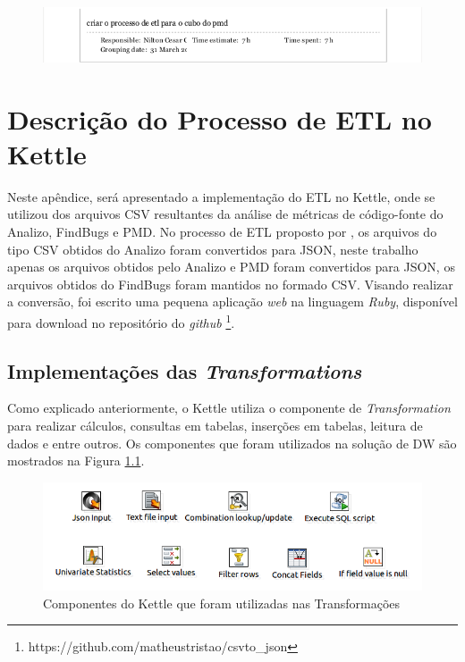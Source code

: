 \begin{apendicesenv}
\begin{figure}[h!]
\centering
\includegraphics[keepaspectratio=false,scale=0.70]{figuras/figuras_nilton/kanban5.png}
\end{figure}




\chapter{Descrição do Processo de ETL no Kettle}
\label{sec:implementação-etl}

Neste apêndice, será apresentado a implementação do ETL no Kettle, onde se utilizou dos arquivos CSV resultantes da análise de métricas de código-fonte do Analizo, FindBugs e PMD.
No processo de ETL proposto por , os arquivos do tipo CSV obtidos do Analizo foram convertidos para JSON, neste trabalho apenas os arquivos obtidos pelo Analizo e PMD foram convertidos para JSON, os arquivos obtidos do FindBugs foram mantidos no formado CSV. Visando realizar a conversão, foi escrito uma pequena aplicação \textit{web} na linguagem \textit{Ruby}, disponível para download no repositório do \textit{github} \footnote{https://github.com/matheustristao/csvto\_json}. 


\section{Implementações das \textit{Transformations}}


Como explicado anteriormente, o Kettle utiliza o componente de \textit{Transformation} para realizar cálculos, consultas em tabelas, inserções em tabelas, leitura de dados e entre outros. Os componentes que foram utilizados na solução de DW são mostrados na Figura \ref{fig:componentsetl}.


\begin{figure}[h!]
\centering
\includegraphics[keepaspectratio=false,scale=0.6]{figuras/figuras_nilton/componentsetl.png}
\caption{Componentes do Kettle que foram utilizadas nas Transformações}
\label{fig:componentsetl}
\end{figure}


\end{apendicesenv}
